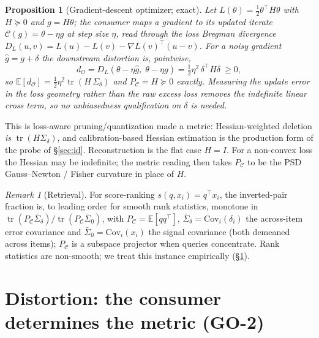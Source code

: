 \documentclass[lettersize,onecolumn]{IEEEtran}
\newtheorem{proposition}{Proposition}
\theoremstyle{definition}
\theoremstyle{remark}
\newtheorem*{remark}{Remark}
\newcommand{\PC}{P_{\mathcal{C}}}
\newcommand{\Sd}{\Sigma_{\delta}}
\newcommand{\tr}{\operatorname{tr}}
\newcommand{\dO}{d_{\mathcal{O}}}
\newcommand{\E}{\mathbb{E}}
\begin{document}
\begin{proposition}[Gradient-descent optimizer; exact]\label{prop:opt}
Let $L(\theta)=\tfrac12\theta^\top H\theta$ with $H\succeq0$ and $g=H\theta$; the
consumer maps a gradient to its updated iterate $\mathcal{C}(g)=\theta-\eta g$ at step
size $\eta$, read through the loss \emph{Bregman divergence}
$D_L(u,v)=L(u)-L(v)-\nabla L(v)^\top(u-v)$. For a noisy gradient $\hat g=g+\delta$ the
downstream distortion is, \emph{pointwise},
\[
\dO=D_L(\theta-\eta\hat g,\;\theta-\eta g)=\tfrac12\eta^2\,\delta^\top H\delta\ \ge0,
\]
so $\E[\dO]=\tfrac12\eta^2\tr(H\,\Sd)$ and $\PC=H\succeq0$ \emph{exactly}. Measuring the
update error in the loss geometry rather than the raw excess loss removes the
indefinite linear cross term, so no unbiasedness qualification on $\delta$ is needed.
\end{proposition}
\noindent This is loss-aware pruning/quantization made a metric: Hessian-weighted
deletion \cite{lecun1990,hassibi1993,dong2019hawq,frantar2023gptq} \emph{is}
$\tr(H\Sd)$, and calibration-based Hessian estimation is the production form of the
probe of \S\ref{sec:id}. Reconstruction is the flat case $H=I$. For a non-convex
loss the Hessian may be indefinite; the metric reading then takes $\PC$ to be the
PSD Gauss--Newton / Fisher curvature in place of $H$.

\begin{remark}[Retrieval]
For score-ranking $s(q,x_i)=q^\top x_i$, the inverted-pair fraction is, to leading
order for smooth rank statistics, monotone in
$\tr(\PC\bar\Sigma_\delta)/\tr(\PC\bar\Sigma_0)$, with $\PC=\E[qq^\top]$,
$\bar\Sigma_\delta=\mathrm{Cov}_i(\delta_i)$ the across-item error covariance and
$\bar\Sigma_0=\mathrm{Cov}_i(x_i)$ the signal covariance (both demeaned across items);
$\PC$ is a subspace projector when queries concentrate. Rank statistics are
non-smooth; we treat this instance empirically (\S\ref{sec:distortion}).
\end{remark}

\section{Distortion: the consumer determines the metric (GO-2)}\label{sec:distortion}
\end{document}
